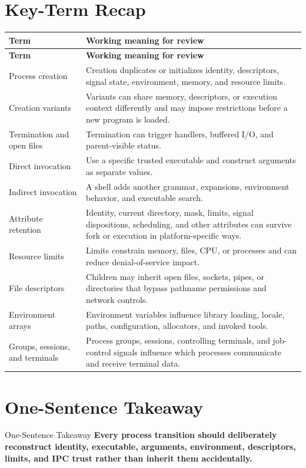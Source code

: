 \documentclass[11pt,letterpaper]{article}
\begin{document}
\section{Key-Term Recap}
\begin{longtable}{>{\raggedright\arraybackslash}p{}p{}}
\toprule
\textbf{Term} & \textbf{Working meaning for review} \\
\midrule
\endfirsthead
\toprule
\textbf{Term} & \textbf{Working meaning for review} \\
\midrule
\endhead
Process creation & Creation duplicates or initializes identity, descriptors, signal state, environment, memory, and resource limits. \\
Creation variants & Variants can share memory, descriptors, or execution context differently and may impose restrictions before a new program is loaded. \\
Termination and open files & Termination can trigger handlers, buffered I/O, and parent-visible status. \\
Direct invocation & Use a specific trusted executable and construct arguments as separate values. \\
Indirect invocation & A shell adds another grammar, expansions, environment behavior, and executable search. \\
Attribute retention & Identity, current directory, mask, limits, signal dispositions, scheduling, and other attributes can survive fork or execution in platform-specific ways. \\
Resource limits & Limits constrain memory, files, CPU, or processes and can reduce denial-of-service impact. \\
File descriptors & Children may inherit open files, sockets, pipes, or directories that bypass pathname permissions and network controls. \\
Environment arrays & Environment variables influence library loading, locale, paths, configuration, allocators, and invoked tools. \\
Groups, sessions, and terminals & Process groups, sessions, controlling terminals, and job-control signals influence which processes communicate and receive terminal data. \\
\bottomrule
\end{longtable}
\section{One-Sentence Takeaway}
\begin{CornellExamBox}{One-Sentence Takeaway}
\textbf{Every process transition should deliberately reconstruct identity, executable, arguments, environment, descriptors, limits, and IPC trust rather than inherit them accidentally.}
\end{CornellExamBox}
\end{document}
